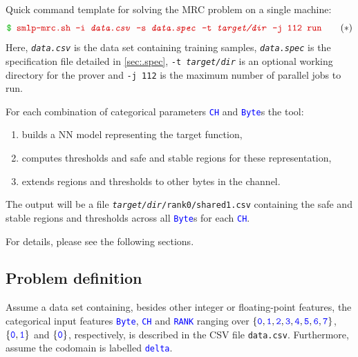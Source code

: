 \documentclass[a4paper,parskip=half]{article} %
\newcommand*\cmdstyle\texttt
\newcommand*\file\cmdstyle
\newcommand*\literalColor{blue}
\newcommand*\cmd[1]{\cmdstyle{\textcolor{red!85!black}{#1}}}
\newcommand*\cmdline[1]{\cmdstyle{\textcolor{green!70!black}\$ }\cmd{#1}}
\newcommand*\literal[1]{\textcolor{\literalColor}{\cmdstyle{#1}}}
\newcommand*\progmrc{smlp-mrc.sh}
\begin{document}
Quick command template for solving the MRC problem on a single machine:
\begin{equation}
\cmdline{\progmrc{} -i \emph{data.csv} -s \emph{data.spec} -t \emph{target/dir} -j 112 run}
\tag{$*$}\label{cmd:mrc}
\end{equation}
Here, \file{\emph{data.csv}} is the data set containing training samples,
\file{\emph{data.spec}} is the specification file detailed in \cref{sec:.spec},
\cmdstyle{-t \emph{target/dir}} is an optional working directory for the prover and \cmdstyle{-j 112} is the maximum number of parallel jobs to run.

For each combination of categorical parameters \literal{CH} and \literal{Byte}s the tool: 
\begin{enumerate}
\item builds a NN model representing the target function,
\item computes thresholds and safe and stable regions for these representation,
\item extends regions and thresholds to other bytes in the channel.
\end{enumerate}

The output will be a file \file{\emph{target/dir}/rank0/shared1.csv} containing
the safe and stable regions and thresholds across all \literal{Byte}s for each
\literal{CH}.

For details, please see the following sections.


\subsection{Problem definition}\label{sec:mrc-def}
Assume a data set containing, besides other integer or floating-point features,
the categorical input features \literal{Byte},
\literal{CH} and \literal{RANK} ranging over
$\{\literal0,\literal1,\literal2,\literal3,\literal4,\literal5,\literal6,\literal7\}$,
$\{\literal0,\literal1\}$ and $\{\literal0\}$, respectively,
is described in the CSV file \file{data.csv}. Furthermore, assume the codomain
is labelled \literal{delta}.
\end{document}
